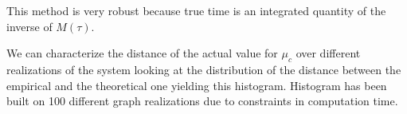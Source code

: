 This method is very robust because true time is an integrated quantity of the inverse of $M(\tau)$.

We can characterize the distance of the actual value for $\mu_c$ over different realizations of the system looking at the distribution of the distance between the empirical and the theoretical one yielding this histogram. Histogram has been built on 100 different graph realizations due to constraints in computation time.


